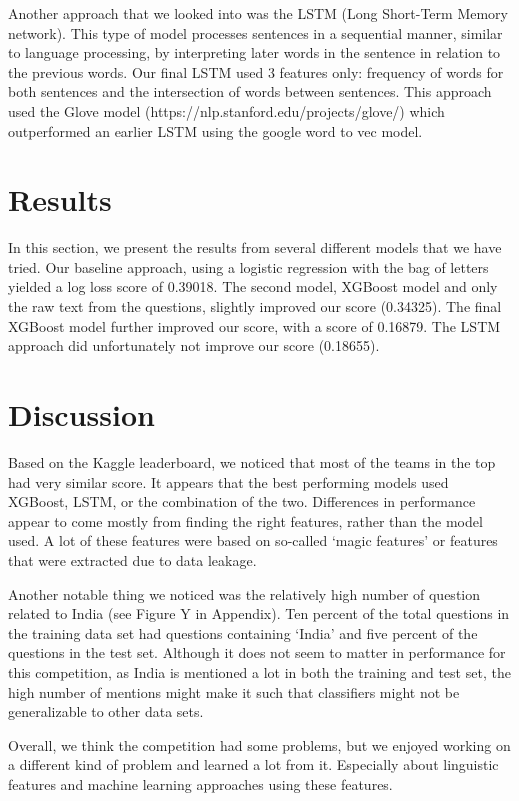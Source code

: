 \documentclass[a4paper]{article}
\begin{document}
Another approach that we looked into was the LSTM (Long Short-Term Memory network). This type of model processes sentences in a sequential manner, similar to language processing, by interpreting later words in the sentence in relation to the previous words. Our final LSTM used 3 features only: frequency of words for both sentences and the intersection of words between sentences. This approach used the Glove model (https://nlp.stanford.edu/projects/glove/) which outperformed an earlier LSTM using the google word to vec model.




\section{Results}

In this section, we present the results from several different models that we have tried. Our baseline approach, using a logistic regression with the bag of letters yielded a log loss score of 0.39018. The second model, XGBoost model and only the raw text from the questions, slightly improved our score (0.34325). The final XGBoost model further improved our score, with a score of 0.16879. The LSTM approach did unfortunately not improve our score (0.18655).


\section{Discussion}

Based on the Kaggle leaderboard, we noticed that most of the teams in the top had very similar score. It appears that the best performing models used XGBoost, LSTM, or the combination of the two. Differences in performance appear to come mostly from finding the right features, rather than the model used. A lot of these features  were based on so-called ‘magic features’ or features that were extracted due to data leakage.
 
Another notable thing we noticed was the relatively high number of question related to India (see Figure Y in Appendix). Ten percent of the total questions in the training data set had questions containing ‘India’ and five percent of the questions in the test set. Although it does not seem to matter in performance for this competition, as India is mentioned a lot in both the training and test set, the high number of mentions might make it such that classifiers might not be generalizable to other data sets.
 
Overall, we think the competition had some problems, but we enjoyed working on a different kind of problem and learned a lot from it. Especially about linguistic features and machine learning approaches using these features.
\end{document}
